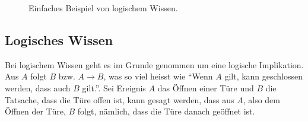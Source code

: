 \begin{figure}[htbp]
\centering {}
\caption{Einfaches Beispiel von logischem Wissen.\label{fig:experten_systeme_prozedurales_wissen}\protect\footnotemark}
\end{figure}

\newpage

\subsection{Logisches Wissen}
\label{subsec:logisches_wissen}

Bei logischem Wissen geht es im Grunde genommen um eine logische Implikation. Aus $A$ folgt $B$ bzw. $A \to B$, was so viel heisst wie ``Wenn $A$ gilt, kann geschlossen werden, dass auch $B$ gilt.''. Sei Ereignis $A$ das Öffnen einer Türe und $B$ die Tatsache, dass die Türe offen ist, kann gesagt werden, dass aus $A$, also dem Öffnen der Türe, $B$ folgt, nämlich, dass die Türe danach geöffnet ist.
\\


